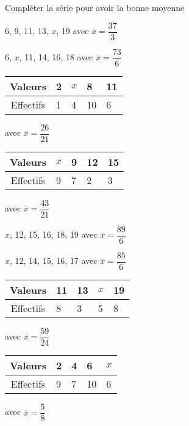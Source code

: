  Compléter la série pour avoir la bonne moyenne

\begin{multicols}{2}

6, 9, 11, 13, $x$, 19   avec $\overline{x}=\dfrac{37}{3}$


6, $x$, 11, 14, 16, 18   avec $\overline{x}=\dfrac{73}{6}$


\begin{tabular}{c*{4}{|p{0.5cm}}}
 Valeurs  & 2 & $x$ & 8 & 11\\ \hline 
 Effectifs  & 1 & 4 & 10 & 6
\end{tabular}
   avec $\overline{x}=\dfrac{26}{21}$


\begin{tabular}{c*{4}{|p{0.5cm}}}
 Valeurs  & $x$ & 9 & 12 & 15\\ \hline 
 Effectifs  & 9 & 7 & 2 & 3
\end{tabular}
   avec $\overline{x}=\dfrac{43}{21}$


$x$, 12, 15, 16, 18, 19   avec $\overline{x}=\dfrac{89}{6}$


$x$, 12, 14, 15, 16, 17   avec $\overline{x}=\dfrac{85}{6}$


\begin{tabular}{c*{4}{|p{0.5cm}}}
 Valeurs  & 11 & 13 & $x$ & 19\\ \hline 
 Effectifs  & 8 & 3 & 5 & 8
\end{tabular}
   avec $\overline{x}=\dfrac{59}{24}$


\begin{tabular}{c*{4}{|p{0.5cm}}}
 Valeurs  & 2 & 4 & 6 & $x$\\ \hline 
 Effectifs  & 9 & 7 & 10 & 6
\end{tabular}
   avec $\overline{x}=\dfrac{5}{8}$

\end{multicols}